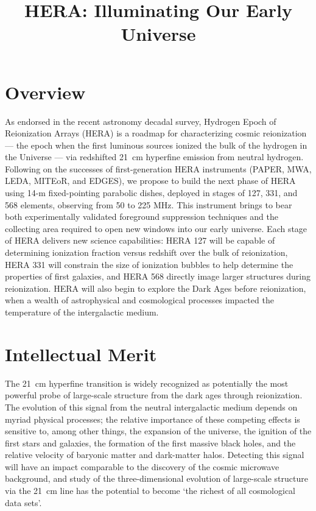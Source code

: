 \documentclass[preprint]{aastex}
\begin{document}
\pagestyle{empty}

\title{HERA: Illuminating Our Early Universe}

\section*{Overview}

As endorsed in the recent astronomy decadal survey, 
Hydrogen Epoch of Reionization Arrays (HERA) is a roadmap for characterizing
cosmic reionization --- the epoch when the first luminous sources ionized the
bulk of the hydrogen in the Universe --- via redshifted 21~cm hyperfine
emission from neutral hydrogen.  Following on the successes of first-generation
HERA instruments (PAPER, MWA, LEDA, MITEoR, and EDGES), we propose to build
the next phase of HERA using 14-m fixed-pointing parabolic dishes, deployed in
stages of 127, 331, and 568 elements, observing from 50 to 225 MHz.
This instrument brings to bear both experimentally validated
foreground suppression techniques and the collecting area required to open new windows into our early
universe.  Each stage of HERA delivers new science capabilities:
HERA 127 will be capable of determining
ionization fraction versus redshift over the bulk of reionization,
HERA 331 will constrain the size of ionization bubbles to help determine the properties of
first galaxies, and HERA 568 directly image larger structures during
reionization.  HERA will also begin to explore the Dark Ages before 
reionization, when a wealth of astrophysical and cosmological processes
impacted the temperature of the intergalactic medium.

\section*{Intellectual Merit}

The 21~cm hyperfine transition is widely recognized as potentially the most
powerful probe of large-scale structure from the dark ages through
reionization.  The evolution of this signal from the neutral intergalactic
medium depends on myriad physical processes; the relative importance of
these competing effects is sensitive to, among other things, the expansion of
the universe, the ignition of the first stars and galaxies, the formation of
the first massive black holes, and the relative
velocity of baryonic matter and dark-matter halos.
Detecting this signal will have an impact
comparable to the discovery of the cosmic microwave background, and study of the three-dimensional
evolution of large-scale structure via the 21~cm line has the
potential to become `the richest of all cosmological data sets'.
\end{document}
